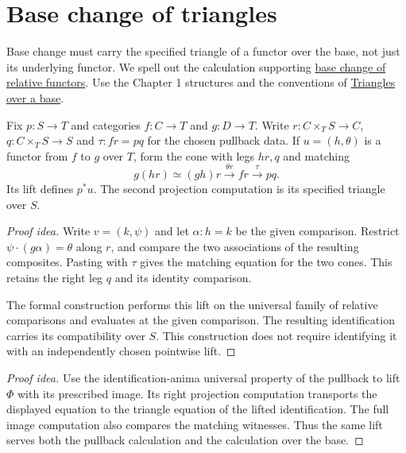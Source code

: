 \documentclass[11pt]{article}
\begin{document}
\section*{Base change of triangles}

Base change must carry the specified triangle of a functor over the base,
not just its underlying functor. We spell out the calculation supporting
\href{exponentiable-functors.html}{base change of relative functors}.
Use the Chapter 1 structures and the conventions of
\href{supplementary-triangles-over-a-base.html}{Triangles over a base}.

Fix $p\colon S\to T$ and categories $f\colon C\to T$ and $g\colon D\to T$.
Write $r\colon C\times_T S\to C$, $q\colon C\times_T S\to S$ and
$\tau\colon fr=pq$ for the chosen pullback data. If $u=(h,\theta)$ is a
functor from $f$ to $g$ over $T$, form the cone with legs $hr,q$ and matching
\[
 g(hr)\simeq(gh)r\xrightarrow{\theta r}fr\xrightarrow{\tau}pq.
\]
Its lift defines $p^*u$. The second projection computation is its specified
triangle over $S$.

\begin{proof}[Proof idea]
Write $v=(k,\psi)$ and let $\alpha\colon h=k$ be the given comparison.
Restrict $\psi\cdot(g\alpha)=\theta$ along $r$, and compare the two
associations of the resulting composites. Pasting with $\tau$ gives the
matching equation for the two cones. This retains the right leg $q$ and
its identity comparison.

The formal construction performs this lift on the universal family of
relative comparisons and evaluates at the given comparison. The resulting
identification carries its compatibility over $S$. This construction does
not require identifying it with an independently chosen pointwise lift.
\end{proof}

\begin{proof}[Proof idea]
Use the identification-anima universal property of the pullback to lift
$\Phi$ with its prescribed image. Its right projection computation transports
the displayed equation to the triangle equation of the lifted
identification. The full image computation also compares the matching
witnesses. Thus the same lift serves both the pullback calculation and the
calculation over the base.
\end{proof}
\end{document}
